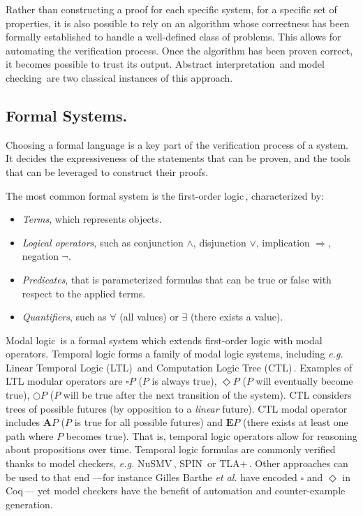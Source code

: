 Rather than constructing a proof for each specific system, for a specific set of
properties, it is also possible to rely on an algorithm whose correctness has
been formally established to handle a well-defined class of problems.
%
This allows for automating the verification process.
%
Once the algorithm has been proven correct, it becomes possible to trust its
output.
%
Abstract interpretation\,\cite{cousot1977absint} and model
checking\,\cite{clarke2018modelc} are two classical instances of this approach.

\subsection{Formal Systems.}
%
Choosing a formal language is a key part of the verification process of a
system.
%
It decides the expressiveness of the statements that can be proven, and the
tools that can be leveraged to construct their proofs.

The most common formal system is the first-order logic\,\cite{smullyan2012fol},
characterized by:
%
\begin{itemize}
\item \emph{Terms}, which represents objects.
\item \emph{Logical operators}, such as conjunction \( \wedge \), disjunction
  \( \vee \), implication \( \Rightarrow \), negation \( \neg \).
\item \emph{Predicates}, that is parameterized formulas that can be true or
  false with respect to the applied terms.
\item \emph{Quantifiers}, such as \( \forall \) (all values) or \( \exists \)
  (there exists a value).
\end{itemize}

Modal logic\,\cite{chagrov1997modal} is a formal system which extends
first-order logic with modal operators.
%
Temporal logic forms a family of modal logic systems, including \emph{e.g.}
Linear Temporal Logic (LTL)\,\cite{sistla1985ltl} and Computation Logic Tree
(CTL)\,\cite{clarke1981ctl}.
%
Examples of LTL modular operators are \( \square P \) (\( P \) is always true),
\( \Diamond P \) (\( P \) will eventually become true), \( \bigcirc P \)
(\( P \) will be true after the next transition of the system).
%
CTL considers trees of possible futures (by opposition to a \emph{linear}
future).
%
CTL modal operator includes \( \mathbf{A} P \) (\( P \) is true for all possible
futures) and \( \mathbf{E} P \) (there exists at least one path where \( P \)
becomes true).
%
That is, temporal logic operators allow for reasoning about propositions over
time.
%
Temporal logic formulas are commonly verified thanks to model checkers,
\emph{e.g.}  NuSMV\,\cite{cimatti2002nusmv}, SPIN\,\cite{holzmann1997spin} or
TLA+\,\cite{lamport2002tla}.
%
Other approaches can be used to that end ---for instance Gilles Barthe \emph{et
  al.} have encoded \( \square \) and \( \Diamond \) in
Coq\,\cite{barthe2011virtcert1}--- yet model checkers have the benefit of
automation and counter-example generation.

